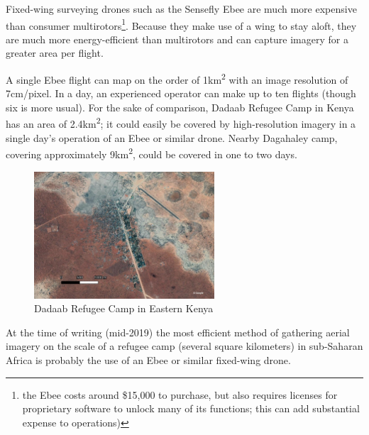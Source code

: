 \documentclass[a4paper,12pt,twoside]{article}
\begin{document}
Fixed-wing surveying drones such as the Sensefly Ebee are much more expensive than consumer multirotors\footnote{the Ebee costs around \$15,000 to purchase, but also requires licenses for proprietary software to unlock many of its functions; this can add substantial expense to operations)}. Because they make use of a wing to stay aloft, they are much more energy-efficient than multirotors and can capture imagery for a greater area per flight.

A single Ebee flight can map on the order of 1km\textsuperscript{2} with an image resolution of 7cm/pixel. In a day, an experienced operator can make up to ten flights (though six is more usual). For the sake of comparison, Dadaab Refugee Camp in Kenya has an area of 2.4km\textsuperscript{2}; it could easily be covered by high-resolution imagery in a single day's operation of an Ebee or similar drone. Nearby Dagahaley camp, covering approximately 9km\textsuperscript{2}, could be covered in one to two days.

\begin{figure}[H]
    \centering
    \includegraphics[width=0.6\textwidth]{images/dadaab.jpeg}
    \caption{Dadaab Refugee Camp in Eastern Kenya}
    \label{fig:Dadaab Refugee Camp}
\end{figure}

At the time of writing (mid-2019) the most efficient method of gathering aerial imagery on the scale of a refugee camp (several square kilometers) in sub-Saharan Africa is probably the use of an Ebee or similar fixed-wing drone. 
\end{document}
